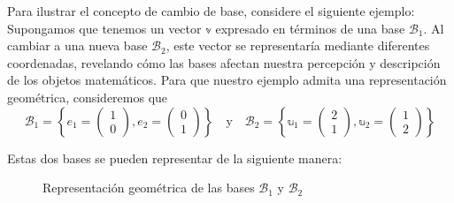 Para ilustrar el concepto de cambio de base, considere el siguiente ejemplo: Supongamos que tenemos un vector $\mathbb{v}$ expresado en términos de una base $\mathcal{B}_1$. Al cambiar a una nueva base $\mathcal{B}_2$, este vector se representaría mediante diferentes coordenadas, revelando cómo las bases afectan nuestra percepción y descripción de los objetos matemáticos. Para que nuestro ejemplo admita una representación geométrica, consideremos que
$$\mathcal{B}_1 = \left\{ e_1 = \begin{pmatrix}
    1 \\
    0
\end{pmatrix},  e_2 = \begin{pmatrix}
    0 \\
    1
\end{pmatrix} \right\} \quad \text{y} \quad \mathcal{B}_2 = \left\{ \mathbb{u}_1 = \begin{pmatrix}
    2 \\
    1
\end{pmatrix},  \mathbb{u}_2 = \begin{pmatrix}
    1 \\
    2
\end{pmatrix} \right\}$$

Estas dos bases se pueden representar de la siguiente manera:
\begin{figure}[h!]
    \centering
    \caption{Representación geométrica de las bases $\mathcal{B}_1$ y $\mathcal{B}_2$}
\end{figure}

